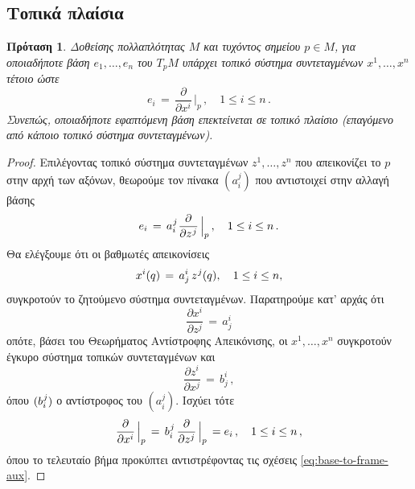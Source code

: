 \documentclass[11pt,a4paper,twoside,openright]{book}
\newtheorem{proposition}[lemma]{Πρόταση}
\begin{document}
\subsection{Τοπικά πλαίσια}
	\label{sec:local-frames}
	
\begin{proposition}
\label{prop:base-to-frame}
Δοθείσης πολλαπλότητας $M$ και τυχόντος σημείου $p \in M$,
για οποιαδήποτε βάση $e_1, \dots, e_n$ του $Τ_pM$
υπάρχει τοπικό σύστημα συντεταγμένων $x^1, \dots, x^n$
τέτοιο ώστε
\begin{equation}\label{eq:base-to-frame-aux}
e_i
\,
=
\,
\frac{\partial}{\partial x^i}\,\Big|_p\,,
\quad
1 \le i \le n\,.
\end{equation}
Συνεπώς, οποιαδήποτε εφαπτόμενη βάση επεκτείνεται σε τοπικό πλαίσιο (επαγόμενο από κάποιο τοπικό σύστημα συντεταγμένων).
\end{proposition}
\begin{proof}
Επιλέγοντας τοπικό σύστημα συντεταγμένων $z^1, \dots, z^n$ που απεικονίζει
το $p$ στην αρχή των αξόνων,
θεωρούμε τον πίνακα $(a_i^j)$
που αντιστοιχεί στην αλλαγή βάσης
\begin{equation}
e_i
\,
=
\,
a_i^{\hspace{.5pt}j} \hspace{.5pt} \frac{\partial}{\partial z^{\hspace{.5pt}j}}\,\Big|_p\,,
\quad
1 \le i \le n\,.
\end{equation}
Θα ελέγξουμε ότι οι βαθμωτές απεικονίσεις
\begin{equation*}
x^i(q)
\,
=
\,
a^i_j \, z^{\hspace{.5pt}j}(q),
\quad
1 \le i \le n,
\end{equation*}
συγκροτούν το ζητούμενο σύστημα συντεταγμένων.
Παρατηρούμε κατ' αρχάς ότι
\begin{equation*}
\frac{\partial x^i}{\partial z^j}
\,
=
\,
a^i_j
\end{equation*}
οπότε, βάσει του Θεωρήματος Αντίστροφης Απεικόνισης,
οι $x^1, \dots, x^n$ συγκροτούν έγκυρο σύστημα τοπικών συντεταγμένων και
\begin{equation}
\frac{\partial z^i}{\partial x^j}
\,
=
\,
b^i_j\,,
\end{equation}
όπου $(b_i^{\hspace{.5pt}j})$ ο αντίστροφος του $(a_i^j)$. Ισχύει τότε
\begin{equation*}
\frac{\partial}{\partial x^i}\,\Big|_p
\,
=
\,
b_i^{\hspace{.5pt}j}\,\frac{\partial}{\partial z^j}\,\Big|_p
\,
=
e_i\,,
\quad
1 \le i \le n\,,
\end{equation*}
όπου το τελευταίο βήμα προκύπτει αντιστρέφοντας τις σχέσεις
\eqref{eq:base-to-frame-aux}.
\end{proof}
\end{document}
